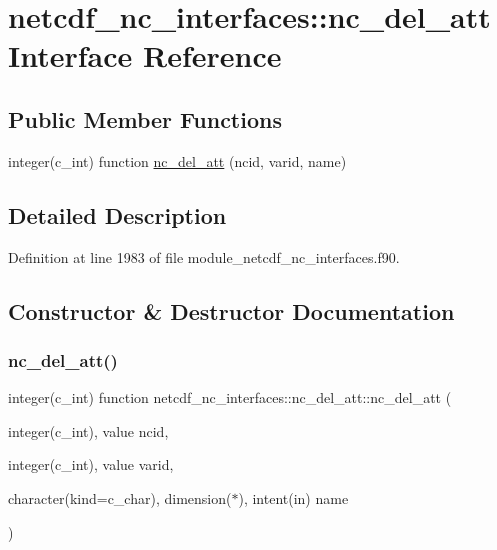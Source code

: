 \hypertarget{interfacenetcdf__nc__interfaces_1_1nc__del__att}{}\section{netcdf\+\_\+nc\+\_\+interfaces\+:\+:nc\+\_\+del\+\_\+att Interface Reference}
\label{interfacenetcdf__nc__interfaces_1_1nc__del__att}
\subsection*{Public Member Functions}
\begin{DoxyCompactItemize}
\item 
integer(c\+\_\+int) function \hyperlink{interfacenetcdf__nc__interfaces_1_1nc__del__att_a6d17aaa10b2931e98554277302f48926}{nc\+\_\+del\+\_\+att} (ncid, varid, name)
\end{DoxyCompactItemize}


\subsection{Detailed Description}


Definition at line 1983 of file module\+\_\+netcdf\+\_\+nc\+\_\+interfaces.\+f90.



\subsection{Constructor \& Destructor Documentation}
\mbox{\label{interfacenetcdf__nc__interfaces_1_1nc__del__att_a6d17aaa10b2931e98554277302f48926}} 
\subsubsection{\texorpdfstring{nc\+\_\+del\+\_\+att()}{nc\_del\_att()}}
{\footnotesize\ttfamily integer(c\+\_\+int) function netcdf\+\_\+nc\+\_\+interfaces\+::nc\+\_\+del\+\_\+att\+::nc\+\_\+del\+\_\+att (\begin{DoxyParamCaption}\item[{integer(c\+\_\+int), value}]{ncid,  }\item[{integer(c\+\_\+int), value}]{varid,  }\item[{character(kind=c\+\_\+char), dimension($\ast$), intent(in)}]{name }\end{DoxyParamCaption})}



